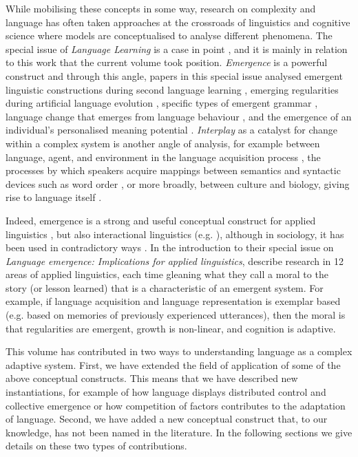 \documentclass[output=paper]{langscibook}
\begin{document}
While mobilising these concepts in some way, research on complexity and language has often taken approaches at the crossroads of linguistics and cognitive science where models are conceptualised to analyse different phenomena. The special issue of \textit{Language Learning} is a case in point \citep{BecknerEtAl2009}, and it is mainly in relation to this work that the current volume took position. \textit{Emergence} is a powerful construct and through this angle, papers in this special issue analysed emergent linguistic constructions during second language learning \citep{EllisLarsenFreeman2009}, emerging regularities during artificial language evolution \citep{CornishEtAl2009}, specific types of emergent grammar \citep{BecknerBybee2009}, language change that emerges from language behaviour \citep{BlytheCroft2009}, and the emergence of an individual’s personalised meaning potential \citep{Matthiessen2009}. \textit{Interplay} as a catalyst for change within a complex system is another angle of analysis, for example between language, agent, and environment in the language acquisition process \citep{Dörnyei2009}, the processes by which speakers acquire mappings between semantics and syntactic devices such as word order \citep{BoydEtAl2009}, or more broadly, between culture and biology, giving rise to language itself \citep{Schoenemann2009}.

Indeed, emergence is a strong and useful conceptual construct for applied linguistics \citep{EllisLarsen-Freeman2006}, but also interactional linguistics (e.g. \citealt{Mondada2009,DeppermannEtAl2010}), although in sociology, it has been used in contradictory ways \citep{KeithSawyer2001}. In the introduction to their special issue on \textit{Language emergence: Implications for applied linguistics}, \citet{EllisLarsen-Freeman2006} describe research in 12 areas of applied linguistics, each time gleaning what they call a moral to the story (or lesson learned) that is a characteristic of an emergent system. For example, if language acquisition and language representation is exemplar based (e.g. based on memories of previously experienced utterances), then the moral is that regularities are emergent, growth is non-linear, and cognition is adaptive.\largerpage

This volume has contributed in two ways to understanding language as a complex adaptive system. First, we have extended the field of application of some of the above conceptual constructs. This means that we have described new instantiations, for example of how language displays distributed control and collective emergence or how competition of factors contributes to the adaptation of language. Second, we have added a new conceptual construct that, to our knowledge, has not been named in the literature. In the following sections we give details on these two types of contributions. 
\end{document}
